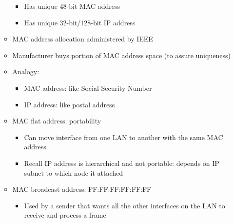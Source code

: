 \begin{itemize}
\begin{itemize}
        \begin{itemize}

          \item Has unique 48-bit MAC address

          \item Has unique 32-bit/128-bit IP address

        \end{itemize}

      \item MAC address allocation administered by IEEE

      \item Manufacturer buys portion of MAC address space (to assure uniqueness)

      \item Analogy:

        \begin{itemize}

          \item MAC address: like Social Security Number

          \item IP address: like postal address

        \end{itemize}

      \item MAC flat address: portability

        \begin{itemize}

          \item Can move interface from one LAN to another with the same MAC address

          \item Recall IP address is hierarchical and not portable: depends on IP subnet to which node it attached

        \end{itemize}

      \item MAC broadcast address: FF:FF:FF:FF:FF:FF

        \begin{itemize}

          \item Used by a sender that wants all the other interfaces on the LAN to receive and process a frame

        \end{itemize}

    \end{itemize}


\end{itemize}
